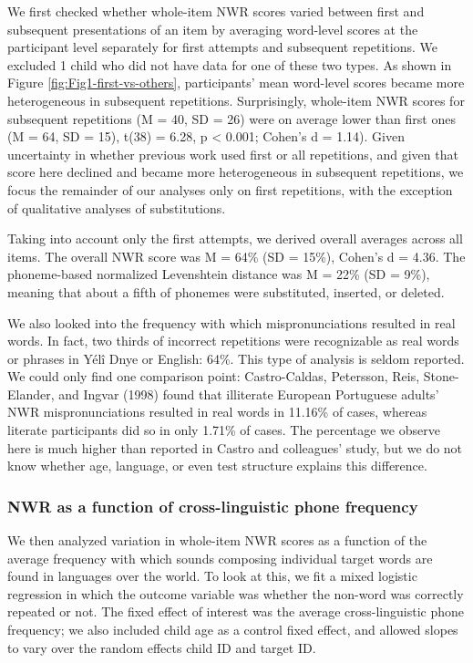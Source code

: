 \documentclass[english,,man,floatsintext]{apa6}
\begin{document}
We first checked whether whole-item NWR scores varied between first and subsequent presentations of an item by averaging word-level scores at the participant level separately for first attempts and subsequent repetitions. We excluded 1 child who did not have data for one of these two types. As shown in Figure \ref{fig:Fig1-first-vs-others}, participants' mean word-level scores became more heterogeneous in subsequent repetitions. Surprisingly, whole-item NWR scores for subsequent repetitions (M = 40, SD = 26)
were on average lower than first ones (M = 64, SD = 15), t(38) = 6.28, p \textless{} 0.001; Cohen's d = 1.14). Given uncertainty in whether previous work used first or all repetitions, and given that score here declined and became more heterogeneous in subsequent repetitions, we focus the remainder of our analyses only on first repetitions, with the exception of qualitative analyses of substitutions.

Taking into account only the first attempts, we derived overall averages across all items. The overall NWR score was M = 64\% (SD = 15\%), Cohen's d = 4.36. The phoneme-based normalized Levenshtein distance was M = 22\% (SD = 9\%), meaning that about a fifth of phonemes were substituted, inserted, or deleted.

We also looked into the frequency with which mispronunciations resulted in real words. In fact, two thirds of incorrect repetitions were recognizable as real words or phrases in Yélî Dnye or English: 64\%. This type of analysis is seldom reported. We could only find one comparison point: Castro-Caldas, Petersson, Reis, Stone-Elander, and Ingvar (1998) found that illiterate European Portuguese adults' NWR mispronunciations resulted in real words in 11.16\% of cases, whereas literate participants did so in only 1.71\% of cases. The percentage we observe here is much higher than reported in Castro and colleagues' study, but we do not know whether age, language, or even test structure explains this difference.

\hypertarget{nwr-as-a-function-of-cross-linguistic-phone-frequency}{%
\subsubsection{NWR as a function of cross-linguistic phone frequency}\label{nwr-as-a-function-of-cross-linguistic-phone-frequency}}

We then analyzed variation in whole-item NWR scores as a function of the average frequency with which sounds composing individual target words are found in languages over the world. To look at this, we fit a mixed logistic regression in which the outcome variable was whether the non-word was correctly repeated or not. The fixed effect of interest was the average cross-linguistic phone frequency; we also included child age as a control fixed effect, and allowed slopes to vary over the random effects child ID and target ID.
\end{document}
